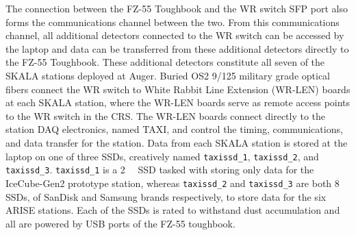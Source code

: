 The connection between the FZ-55 Toughbook and the WR switch SFP port also forms the communications channel between the two.
From this communications channel, all additional detectors connected to the WR switch can be accessed by the laptop and data can be transferred from these additional detectors directly to the FZ-55 Toughbook.
These additional detectors constitute all seven of the SKALA stations deployed at Auger.
Buried OS2 9/125 military grade optical fibers connect the WR switch to White Rabbit Line Extension (WR-LEN) boards at each SKALA station, where the WR-LEN boards serve as remote access points to the WR switch in the CRS.
The WR-LEN boards connect directly to the station DAQ electronics, named TAXI, and control the timing, communications, and data transfer for the station.
Data from each SKALA station is stored at the laptop on one of three SSDs, creatively named \texttt{taxissd\_1}, \texttt{taxissd\_2}, and \texttt{taxissd\_3}.
\texttt{taxissd\_1} is a \SI{2}{\tera\byte} SSD tasked with storing only data for the IceCube-Gen2 prototype station, whereas \texttt{taxissd\_2} and \texttt{taxissd\_3} are both \SI{8}{\tera\byte} SSDs, of SanDisk and Samsung brands respectively, to store data for the six ARISE stations.
Each of the SSDs is rated to withstand dust accumulation and all are powered by USB ports of the FZ-55 toughbook.

